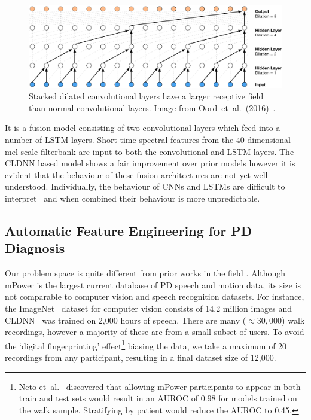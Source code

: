 \documentclass[12pt, twoside]{book}
\begin{document}
\begin{figure}[h]
	\centering\centerline{\includegraphics[width=1\linewidth]{wavenet.png}}
	\caption{Stacked dilated convolutional layers have a larger receptive field than normal convolutional layers. Image from Oord~et~al.~(2016)~\cite{wavenet}.}
	\label{wavenet}
\end{figure}

It is a fusion model consisting of two convolutional layers which feed into a number of LSTM layers. Short time spectral features from the 40 dimensional mel-scale filterbank are input to both the convolutional and LSTM layers. The CLDNN based model shows a fair improvement over prior models however it is evident that the behaviour of these fusion architectures are not yet well understood. Individually, the behaviour of CNNs and LSTMs are difficult to interpret~\cite{cnnvis, visualisernn} and when combined their behaviour is more unpredictable.


\subsection{Automatic Feature Engineering for PD Diagnosis}

Our problem space is quite different from prior works in the field . Although mPower is the largest current database of PD speech and motion data, its size is not comparable to computer vision and speech recognition datasets. For instance, the ImageNet~\cite{imagenet} dataset for computer vision consists of 14.2 million images and CLDNN~\cite{convlstm} was trained on 2,000 hours of speech. There are many ($\approx30,000$) walk recordings, however a majority of these are from a small subset of users. To avoid the `digital fingerprinting' effect\footnote{Neto et~al.~\cite{mpowerneto2017analysis} discovered that allowing mPower participants to appear in both train and test sets would result in an AUROC of 0.98 for models trained on the walk sample. Stratifying by patient would reduce the AUROC to 0.45.} biasing the data, we take a maximum of 20 recordings from any participant, resulting in a final dataset size of 12,000.
\end{document}
